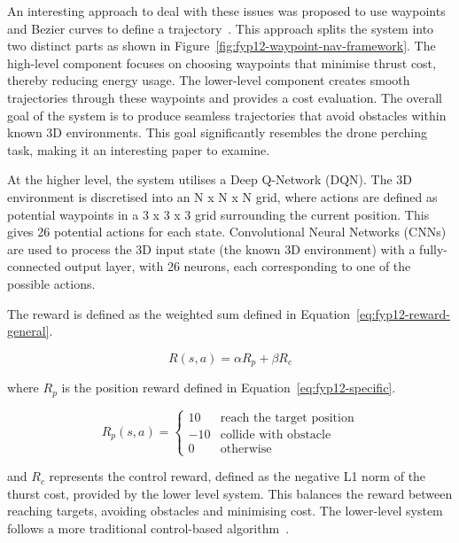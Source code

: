 An interesting approach to deal with these issues was proposed to use waypoints and Bezier curves to define a trajectory~\cite{fyp12-waypoint-navigation}.
This approach splits the system into two distinct parts as shown in Figure~\ref{fig:fyp12-waypoint-nav-framework}.
The high-level component focuses on choosing waypoints that minimise thrust cost, thereby reducing energy usage.
The lower-level component creates smooth trajectories through these waypoints and provides a cost evaluation.
The overall goal of the system is to produce seamless trajectories that avoid obstacles within known 3D environments.
This goal significantly resembles the drone perching task, making it an interesting paper to examine.

At the higher level, the system utilises a Deep Q-Network (DQN).
The 3D environment is discretised into an N x N x N grid, where actions are defined as potential waypoints in a 3 x 3 x 3 grid surrounding the current position.
This gives 26 potential actions for each state.
Convolutional Neural Networks (CNNs) are used to process the 3D input state (the known 3D environment) with a fully-connected output layer, with 26 neurons, each corresponding to one of the possible actions.

The reward is defined as the weighted sum defined in Equation~\ref{eq:fyp12-reward-general}.

\begin{equation}
  R(s, a) = \alpha R_{p} + \beta R_{c}
  \label{eq:fyp12-reward-general}
\end{equation}

where $R_{p}$ is the position reward defined in Equation~\ref{eq:fyp12-specific}.

\begin{equation}
  R_{p}(s, a) = 
  \begin{cases} 
  10 & \text{reach the target position} \\
  -10 & \text{collide with obstacle} \\
  0 & \text{otherwise}
  \end{cases}
\label{eq:fyp12-specific}
\end{equation}

and $R_{c}$ represents the control reward, defined as the negative L1 norm of the thurst cost, provided by the lower level system.
This balances the reward between reaching targets, avoiding obstacles and minimising cost.
The lower-level system follows a more traditional control-based algorithm~\cite{fyp12-waypoint-nav2}.

